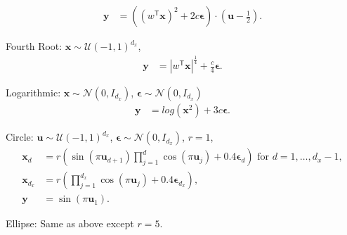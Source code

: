 \documentclass[11pt]{article}
\newcommand{\T}{^{\ensuremath{\mathsf{T}}}}           %
\providecommand{\mb}[1]{\boldsymbol{#1}}
\providecommand{\mc}[1]{\mathcal{#1}}
\begin{document}
\begin{compactenum}
\begin{align*}
\mb{y}&=( (w\T \mb{x})^2  + 2c\mb{\epsilon}) \cdot (\mb{u}-\frac{1}{2}).
\end{align*}
\item Fourth Root: $\mb{x} \sim \mc{U}(-1,1)^{d_{x}}$,
\begin{align*}
\mb{y}&=|w\T \mb{x}|^\frac{1}{4}+\frac{c}{4}\mb{\epsilon}.
\end{align*}
\item Logarithmic: $\mb{x} \sim \mc{N}(0, I_{d_{x}})$, $\mb{\epsilon} \sim \mc{N}(0, I_{d_{x}})$
\begin{align*}
\mb{y}&=log(\mb{x}^2)+3c\mb{\epsilon}.
\end{align*}
\item Circle: $\mb{u} \sim \mc{U}(-1,1)^{d_{x}}$, $\mb{\epsilon} \sim \mc{N}(0, I_{d_{x}})$, $r=1$,
\begin{align*}
\mb{x}_{d}&=r (\sin(\pi \mb{u}_{d+1})  \prod_{j=1}^{d} \cos(\pi \mb{u}_{j})+0.4 \mb{\epsilon}_{d}) \mbox{ for $d=1,\ldots,d_{x}-1$},\\
\mb{x}_{d_{x}}&=r (\prod_{j=1}^{d_{x}} \cos(\pi \mb{u}_{j})+0.4 \mb{\epsilon}_{d_{x}}),\\
\mb{y}&= \sin(\pi \mb{u}_{1}).
\end{align*}
\item Ellipse: Same as above except $r=5$.


\end{compactenum}
\end{document}
